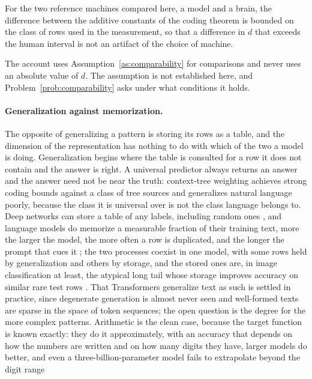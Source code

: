 \begin{assumption}
\label{as:comparability}
For the two reference machines compared here, a model and a brain, the difference between the additive
constants of the coding theorem is bounded on the class of rows used in the measurement, so that a
difference in $d$ that exceeds the human interval is not an artifact of the choice of machine.
\end{assumption}

The account uses Assumption~\ref{as:comparability} for comparisons and never uses an absolute value of
$d$. The assumption is not established here, and Problem~\ref{prob:comparability} asks under what
conditions it holds.

\paragraph{Generalization against memorization.}
The opposite of generalizing a pattern is storing its rows as a table, and the dimension of the
representation has nothing to do with which of the two a model is doing. Generalization begins where
the table is consulted for a row it does not contain and the answer is right. A universal predictor
always returns an answer and the answer need not be near the truth: context-tree weighting achieves
strong coding bounds against a class of tree sources \citep{willems1995} and generalizes natural
language poorly, because the class it is universal over is not the class language belongs to. Deep
networks can store a table of any labels, including random ones \citep{zhang2017}, and language
models do memorize a measurable fraction of their training text, more the larger the model, the more
often a row is duplicated, and the longer the prompt that cues it \citep{carlini2023}; the two
processes coexist in one model, with some rows held by generalization and others by storage, and the
stored ones are, in image classification at least, the atypical long tail whose storage improves
accuracy on similar rare test rows \citep{feldman2020}. That Transformers generalize text as such is
settled in practice, since degenerate generation is almost never seen and well-formed texts are sparse
in the space of token sequences; the open question is the degree for the more complex patterns.
Arithmetic is the clean case, because the target function is known exactly: they do it approximately,
with an accuracy that depends on how the numbers are written and on how many digits they have, larger
models do better, and even a three-billion-parameter model fails to extrapolate beyond the digit range
